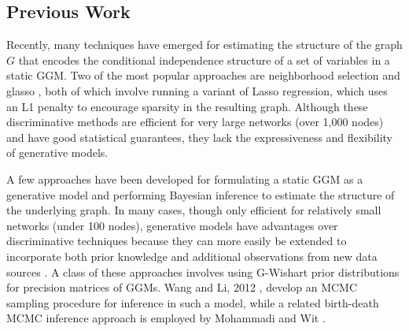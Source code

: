 \documentclass{article}
\begin{document}
\subsection{Previous Work}
\label{sec:prev-work}



Recently, many techniques have emerged for estimating the structure of the graph $G$ that encodes the conditional independence structure of a set of variables in a static GGM. Two of the most popular approaches are neighborhood selection \cite{meinshausen2006high} and glasso \cite{friedman2008sparse}, both of which involve running a variant of Lasso regression, which uses an L1 penalty to encourage sparsity in the resulting graph. Although these discriminative methods are efficient for very large networks (over 1,000 nodes) and have good statistical guarantees, they lack the expressiveness and flexibility of generative models.

A few approaches have been developed for formulating a static GGM as a generative model and performing Bayesian inference to estimate the structure of the underlying graph. In many cases, though only efficient for relatively small networks (under 100 nodes), generative models have advantages over discriminative techniques because they can more easily be extended to incorporate both prior knowledge and additional observations from new data sources \cite{roverato2002hyper,jones2005experiments,green1995reversible}. A class of these approaches involves using G-Wishart prior distributions for precision matrices of GGMs. Wang and Li, 2012 \cite{wang2012efficient}, develop an MCMC sampling procedure for inference in such a model, while a related birth-death MCMC inference approach is employed by Mohammadi and Wit \cite{mohammadi2012efficient}.
\end{document}
